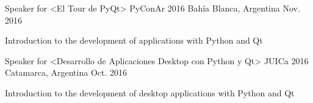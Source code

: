 

\begin{cventries}

  \cventry
    {Speaker for <El Tour de PyQt>} %
    {PyConAr 2016} %
    {Bahía Blanca, Argentina} %
    {Nov. 2016} %
    {
      \begin{cvitems} %
        \item {Introduction to the development of applications with Python and Qt}
      \end{cvitems}
    }

    \cventry
    {Speaker for <Desarrollo de Aplicaciones Desktop con Python y Qt>} %
    {JUICa 2016} %
    {Catamarca, Argentina} %
    {Oct. 2016} %
    {
      \begin{cvitems} %
        \item {Introduction to the development of desktop applications with Python and Qt}
      \end{cvitems}
    }
\end{cventries}
